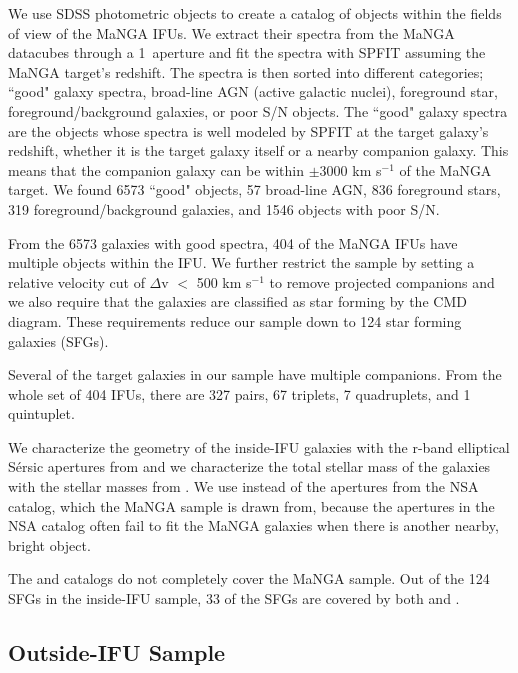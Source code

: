 \documentclass[iop,revtex4,twocolumn,apj,numberedappendix,appendixfloats]{emulateapj}
\begin{document}
We use SDSS photometric objects to create a catalog of objects within the fields of view of the MaNGA IFUs. We extract their spectra from the MaNGA datacubes through a 1\arcsec\ aperture and fit the spectra with {\sc SPFIT} assuming the MaNGA target's redshift. The spectra is then sorted into different categories; ``good" galaxy spectra, broad-line AGN (active galactic nuclei), foreground star, foreground/background galaxies, or poor S/N objects. The ``good" galaxy spectra are the objects whose spectra is well modeled by {\sc SPFIT} at the target galaxy's redshift, whether it is the target galaxy itself or a nearby companion galaxy. This means that the companion galaxy can be within $\pm$3000 km s$^{-1}$ of the MaNGA target. We found 6573 ``good" objects, 57 broad-line AGN, 836 foreground stars, 319 foreground/background galaxies, and 1546 objects with poor S/N. 

From the 6573 galaxies with good spectra, 404 of the MaNGA IFUs have multiple objects within the IFU. We further restrict the sample by setting a relative velocity cut of $\Delta$v $<$ 500 km s$^{-1}$ to remove projected companions and we also require that the galaxies are classified as star forming by the CMD diagram. These requirements reduce our sample down to 124 star forming galaxies (SFGs). 

Several of the target galaxies in our sample have multiple companions. From the whole set of 404 IFUs, there are 327 pairs, 67 triplets, 7 quadruplets, and 1 quintuplet.  

We characterize the geometry of the inside-IFU galaxies with the r-band elliptical S\'ersic apertures from \citet{Simard:2011} and we characterize the total stellar mass of the galaxies with the stellar masses from \citet{Mendel:2014}. We use \citet{Simard:2011} instead of the apertures from the NSA catalog, which the MaNGA sample is drawn from, because the apertures in the NSA catalog often fail to fit the MaNGA galaxies when there is another nearby, bright object. 

The \citet{Simard:2011} and \citet{Mendel:2014} catalogs do not completely cover the MaNGA sample. Out of the 124 SFGs in the inside-IFU sample, 33 of the SFGs are covered by both \citet{Simard:2011} and \citet{Mendel:2014}.

\subsection{Outside-IFU Sample}\label{sec:outside}
\end{document}
